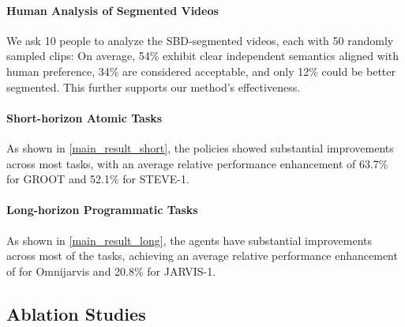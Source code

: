 \paragraph{Human Analysis of Segmented Videos}
We ask 10 people to analyze the SBD-segmented videos, each with 50 randomly sampled clips: On average, 54\% exhibit clear independent semantics aligned with human preference, 34\% are considered acceptable, and only 12\% could be better segmented. This further supports our method’s effectiveness.

\label{subsec:main result}
\paragraph{Short-horizon Atomic Tasks} 
As shown in \cref{main_result_short}, the policies showed substantial improvements across most tasks, with an average relative performance enhancement of 63.7\% for GROOT and 52.1\% for STEVE-1.

\paragraph{Long-horizon Programmatic Tasks}
As shown in \cref{main_result_long}, the agents have substantial improvements across most of the tasks, achieving an average relative performance enhancement of {\omnijarvisresult} for Omnijarvis and 20.8\% for JARVIS-1.


\subsection{Ablation Studies}
\label{subsec:ablation}



